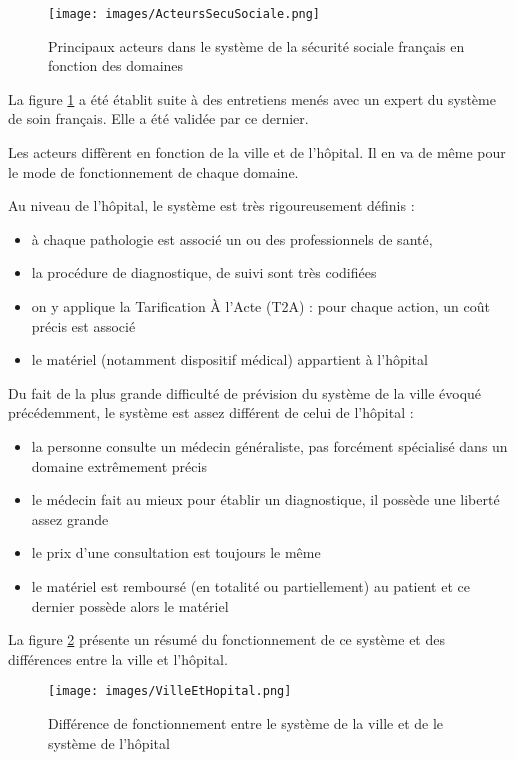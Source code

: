 \begin{figure}[htbp]
\begin{center}
\texttt{[image: images/ActeursSecuSociale.png]} 
\end{center}
\caption{\label{ActeursSecuriteSociale}Principaux acteurs dans le système de la sécurité sociale français en fonction des domaines}
\end{figure}

La figure \ref{ActeursSecuriteSociale} a été établit suite à des entretiens menés avec un expert du système de soin français. Elle a été validée par ce dernier.

Les acteurs diffèrent en fonction de la ville et de l'hôpital. Il en va de même pour le mode de fonctionnement de chaque  domaine.

Au niveau de l'hôpital, le système est très rigoureusement définis : 
\begin{itemize}
\item à chaque pathologie est associé un ou des professionnels de santé,
\item  la procédure de diagnostique, de suivi sont très codifiées
\item on y applique la Tarification À l'Acte (T2A) : pour chaque action, un coût précis est associé
\item le matériel (notamment dispositif médical) appartient à l'hôpital
\end{itemize}

Du fait de la plus grande difficulté de prévision du système de la ville évoqué précédemment, le système est assez différent de celui de l'hôpital : 
\begin{itemize}
\item la personne consulte un médecin généraliste, pas forcément spécialisé dans un domaine extrêmement précis
\item le médecin fait au mieux pour établir un diagnostique, il possède une liberté assez grande
\item le prix d'une consultation est toujours le même
\item le matériel est remboursé (en totalité ou partiellement) au patient et ce dernier possède alors le matériel
\end{itemize}
La figure \ref{DifferenceVilleHopital} présente un résumé du fonctionnement de ce système et des différences entre la ville et l'hôpital. 


\begin{figure}[htbp]
\begin{center}
\texttt{[image: images/VilleEtHopital.png]} 
\end{center}
\caption{\label{DifferenceVilleHopital} Différence de fonctionnement entre le système de la ville et de le système de l'hôpital}

\end{figure}

